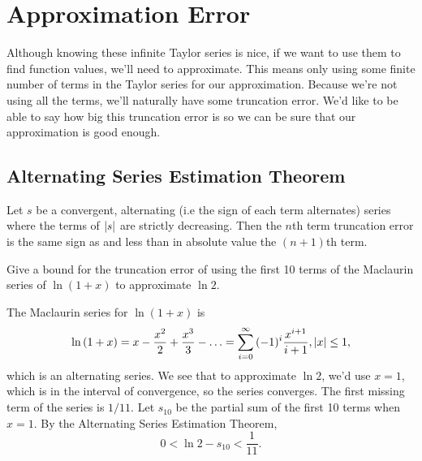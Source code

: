 \section{Approximation Error}
Although knowing these infinite Taylor series is nice, if we want to use them to find function values, we'll need to approximate.
This means only using some finite number of terms in the Taylor series for our approximation.
Because we're not using all the terms, we'll naturally have some truncation error.
We'd like to be able to say how big this truncation error is so we can be sure that our approximation is good enough.

\subsection{Alternating Series Estimation Theorem}
\begin{theorem}
	Let $s$ be a convergent, alternating (i.e the sign of each term alternates) series where the terms of $\lvert s \rvert$ are strictly decreasing.
	Then the $n$th term truncation error is the same sign as and less than in absolute value the $(n+1)$th term.
\end{theorem}

\begin{example}
	Give a bound for the truncation error of using the first 10 terms of the Maclaurin series of $\ln{(1+x)}$ to approximate $\ln{2}$.
\end{example}
The Maclaurin series for $\ln{(1+x)}$ is
\begin{equation*}
	\ln{(1+x)} = x - \frac{x^2}{2} + \frac{x^3}{3} - \ldots = \sum_{i=0}^{\infty}{(-1)^i\frac{x^{i+1}}{i+1}}, \lvert x \rvert \leq 1,
\end{equation*}
\indent
which is an alternating series.
We see that to approximate $\ln{2}$, we'd use $x=1$, which is in the interval of convergence, so the series converges.
The first missing term of the series is $1/11$.
Let $s_{10}$ be the partial sum of the first 10 terms when $x=1$.
By the Alternating Series Estimation Theorem,
\begin{equation*}
	0 < \ln{2} - s_{10} < \frac{1}{11}. 
\end{equation*}

